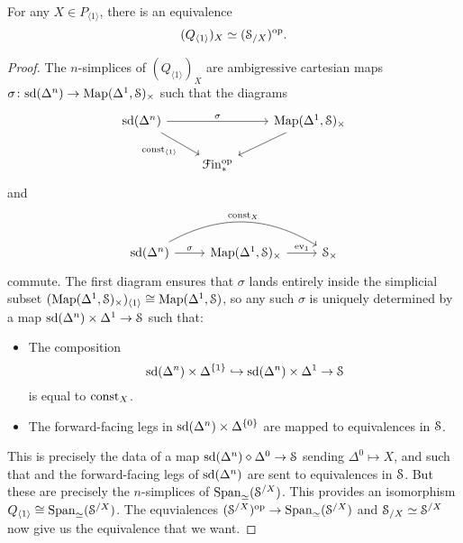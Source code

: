 \documentclass[main.tex]{subfiles}
\begin{document}
\begin{proposition}
  For any $X \in P_{\langle 1 \rangle}$, there is an equivalence
  \begin{equation*}
    (Q_{\langle 1 \rangle})_{X} \simeq (\S_{/X})\op.
  \end{equation*}
\end{proposition}
\begin{proof}
  The $n$-simplices of $(Q_{\langle 1 \rangle})_{X}$ are ambigressive cartesian maps $\sigma\colon \sd(\Delta^{n}) \to \Map(\Delta^{1}, \S)_{\times}$ such that the diagrams
  \begin{equation*}
    \begin{tikzcd}
      \sd(\Delta^{n})
      \arrow[rr, "\sigma"]
      \arrow[dr, swap, "\const_{\langle 1 \rangle}"]
      && \Map(\Delta^{1}, \S)_{\times}
      \arrow[dl]
      \\
      & \Finp\op
    \end{tikzcd}
  \end{equation*}
  and
  \begin{equation*}
    \begin{tikzcd}
      \sd(\Delta^{n})
      \arrow[rr, bend left, "\const_{X}"]
      \arrow[r, "\sigma"]
      & \Map(\Delta^{1}, \S)_{\times}
      \arrow[r, "\ev_{1}"]
      & \S_{\times}
    \end{tikzcd}
  \end{equation*}
  commute. The first diagram ensures that $\sigma$ lands entirely inside the simplicial subset $(\Map(\Delta^{1}, \S)_{\times})_{\langle 1 \rangle} \cong \Map(\Delta^{1}, \S)$, so any such $\sigma$ is uniquely determined by a map $\sd(\Delta^{n}) \times \Delta^{1} \to \S$ such that:
  \begin{itemize}
    \item The composition
      \begin{equation*}
        \sd(\Delta^{n}) \times \Delta^{\{1\}} \hookrightarrow \sd(\Delta^{n}) \times \Delta^{1} \to \S
      \end{equation*}
      is equal to $\const_{X}$.

    \item The forward-facing legs in $\sd(\Delta^{n}) \times \Delta^{\{0\}}$ are mapped to equivalences in $\S$.
  \end{itemize}
  This is precisely the data of a map $\sd(\Delta^{n}) \diamond \Delta^{0} \to \S$ sending $\Delta^{0} \mapsto X$, and such that and the forward-facing legs of $\sd(\Delta^{n})$ are sent to equivalences in $\S$. But these are precisely the $n$-simplices of $\Span_{\simeq}(\S^{/X})$. This provides an isomorphism $Q_{\langle 1 \rangle} \cong \Span_{\simeq}(\S^{/X})$. The equvialences $(\S^{/X})\op \to \Span_{\simeq}(\S^{/X})$ and $\S_{/X} \simeq \S^{/X}$ now give us the equivalence that we want.
\end{proof}
\end{document}
